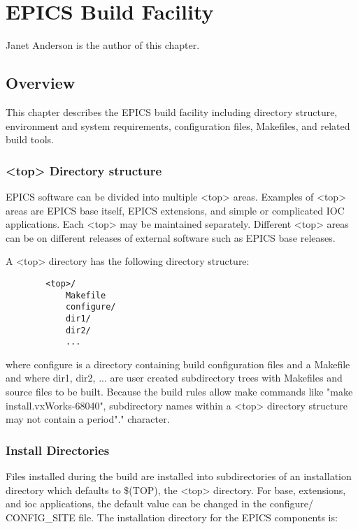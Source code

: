 \chapter{EPICS Build Facility}

Janet Anderson is the author of this chapter.

\section{Overview}

This chapter describes the EPICS build facility including directory structure, environment and system requirements, 
configuration files, Makefiles, and related build tools. 

\subsection{\textless{}top\textgreater{} Directory structure}

EPICS software can be divided into multiple \textless{}top\textgreater{} areas. Examples of \textless{}top\textgreater{} areas are EPICS base itself, EPICS 
extensions, and simple or complicated IOC applications. Each \textless{}top\textgreater{} may be maintained separately. Different \textless{}top\textgreater{} areas 
can be on different releases of external software such as EPICS base releases.

A \textless{}top\textgreater{} directory has the following directory structure:

\begin{verbatim}        <top>/
            Makefile
            configure/
            dir1/
            dir2/
            ...
\end{verbatim}where configure is a directory containing build configuration files and a Makefile and where dir1, dir2, ... are user created 
subdirectory trees with Makefiles and source files to be built. Because the build rules allow make commands like "make 
install.vxWorks-68040", subdirectory names within a \textless{}top\textgreater{} directory structure may not contain a period"." character.

\subsection{Install Directories}

Files installed during the build are installed into subdirectories of an installation directory which defaults to \$(TOP), the 
\textless{}top\textgreater{} directory. For base, extensions, and ioc applications,  the default value can be changed in the configure/
CONFIG\_SITE file. The installation directory for the EPICS components is:


